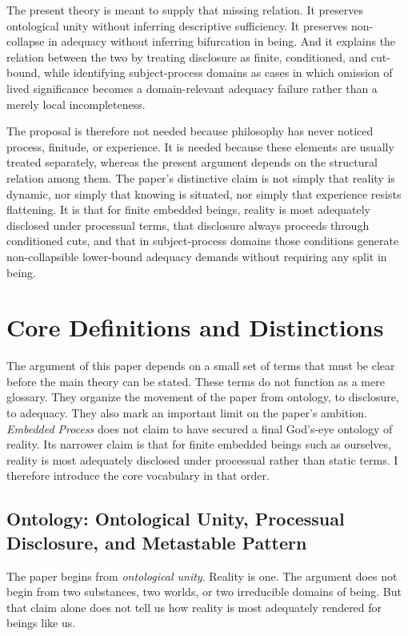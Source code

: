 \documentclass[11pt]{article}
\renewcommand{\emph}[1]{\textit{#1}}
\begin{document}
The present theory is meant to supply that missing relation. It preserves ontological unity without inferring descriptive sufficiency. It preserves non-collapse in adequacy without inferring bifurcation in being. And it explains the relation between the two by treating disclosure as finite, conditioned, and cut-bound, while identifying subject-process domains as cases in which omission of lived significance becomes a domain-relevant adequacy failure rather than a merely local incompleteness.

The proposal is therefore not needed because philosophy has never noticed process, finitude, or experience. It is needed because these elements are usually treated separately, whereas the present argument depends on the structural relation among them. The paper's distinctive claim is not simply that reality is dynamic, nor simply that knowing is situated, nor simply that experience resists flattening. It is that for finite embedded beings, reality is most adequately disclosed under processual terms, that disclosure always proceeds through conditioned cuts, and that in subject-process domains those conditions generate non-collapsible lower-bound adequacy demands without requiring any split in being.
\section{Core Definitions and Distinctions}

The argument of this paper depends on a small set of terms that must be clear before the main theory can be stated. These terms do not function as a mere glossary. They organize the movement of the paper from ontology, to disclosure, to adequacy. They also mark an important limit on the paper's ambition. \emph{Embedded Process} does not claim to have secured a final God's-eye ontology of reality. Its narrower claim is that for finite embedded beings such as ourselves, reality is most adequately disclosed under processual rather than static terms. I therefore introduce the core vocabulary in that order.

\subsection{Ontology: Ontological Unity, Processual Disclosure, and Metastable Pattern}

The paper begins from \emph{ontological unity}. Reality is one. The argument does not begin from two substances, two worlds, or two irreducible domains of being. But that claim alone does not tell us how reality is most adequately rendered for beings like us.
\end{document}

